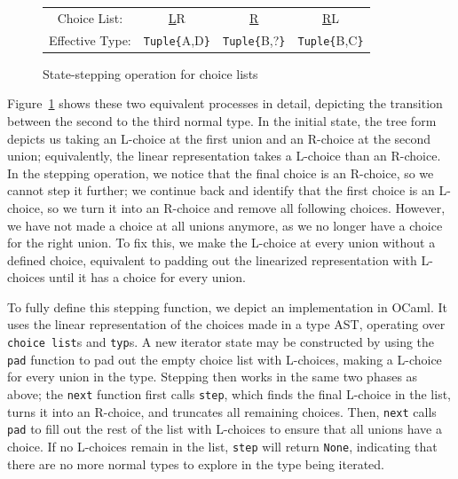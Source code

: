 \documentclass[a4paper,english]{lipics-v2019}
\newcommand{\xt}[1]{\texttt{#1}}
\newcommand{\tuple}[1]{\xt{Tuple\{}#1\xt{\}}}
\begin{document}
\begin{figure}
\begin{tabularx}{\linewidth}{c|ccc}
Choice List: & \underline{L}R & \underline{R} & \underline{R}L \\
Effective Type: & \tuple{A,D} & \tuple{B,?} & \tuple{B,C} \\
\end{tabularx}
\caption{State-stepping operation for choice lists}
\label{fig:sstep}
\end{figure}

Figure~\ref{fig:sstep} shows these two equivalent processes in detail,
depicting the transition between the second to the third normal type. In
the initial state, the tree form depicts us taking an L-choice at the first
union and an R-choice at the second union; equivalently, the linear representation
takes a L-choice than an R-choice. In the stepping operation, we notice that the
final choice is an R-choice, so we cannot step it further; we continue back and
identify that the first choice is an L-choice, so we turn it into an R-choice and
remove all following choices. However, we have not made a choice at all unions
anymore, as we no longer have a choice for the right union. To fix this, we make
the L-choice at every union without a defined choice, equivalent to padding out
the linearized representation with L-choices until it has a choice for every union.

To fully define this stepping function, we depict an implementation in OCaml.
It uses the linear representation of the choices made in a type AST, operating
over \lstinline{choice list}s and \lstinline{typ}s. A new iterator state may
be constructed by using the \lstinline{pad} function to pad out the empty
choice list with L-choices, making a L-choice for every union in the type.
Stepping then works in the same two phases as above; the \lstinline{next}
function first calls \lstinline{step}, which finds the final L-choice in the
list, turns it into an R-choice, and truncates all remaining choices. Then,
\lstinline{next} calls \lstinline{pad} to fill out the rest of the list with
L-choices to ensure that all unions have a choice. If no L-choices remain in
the list, \lstinline{step} will return \lstinline{None}, indicating that there
are no more normal types to explore in the type being iterated.
\end{document}
